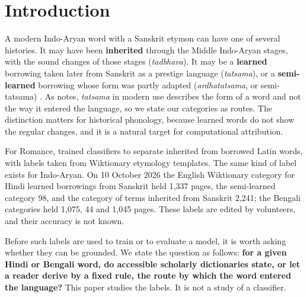 \documentclass[11pt]{article}
\begin{document}
\section{Introduction}

A modern Indo-Aryan word with a Sanskrit etymon can have one of several histories. It may have been \textbf{inherited} through the Middle Indo-Aryan stages, with the sound changes of those stages (\textit{tadbhava}). It may be a \textbf{learned} borrowing taken later from Sanskrit as a prestige language (\textit{tatsama}), or a \textbf{semi-learned} borrowing whose form was partly adapted (\textit{ardhatatsama}, or semi-tatsama) \citep[\S111]{chatterji1926}. As \citeauthor{chatterji1926} notes, \textit{tatsama} in modern use describes the form of a word and not the way it entered the language, so we state our categories as routes. The distinction matters for historical phonology, because learned words do not show the regular changes, and it is a natural target for computational attribution.

For Romance, \citet{cristea2021inherited} trained classifiers to separate inherited from borrowed Latin words, with labels taken from Wiktionary etymology templates. The same kind of label exists for Indo-Aryan. On 10 October 2026 the English Wiktionary category for Hindi learned borrowings from Sanskrit held 1,337 pages, the semi-learned category 98, and the category of terms inherited from Sanskrit 2,241; the Bengali categories held 1,075, 44 and 1,045 pages. These labels are edited by volunteers, and their accuracy is not known.

Before such labels are used to train or to evaluate a model, it is worth asking whether they can be grounded. We state the question as follows: \textbf{for a given Hindi or Bengali word, do accessible scholarly dictionaries state, or let a reader derive by a fixed rule, the route by which the word entered the language?} This paper studies the labels. It is not a study of a classifier.
\end{document}
